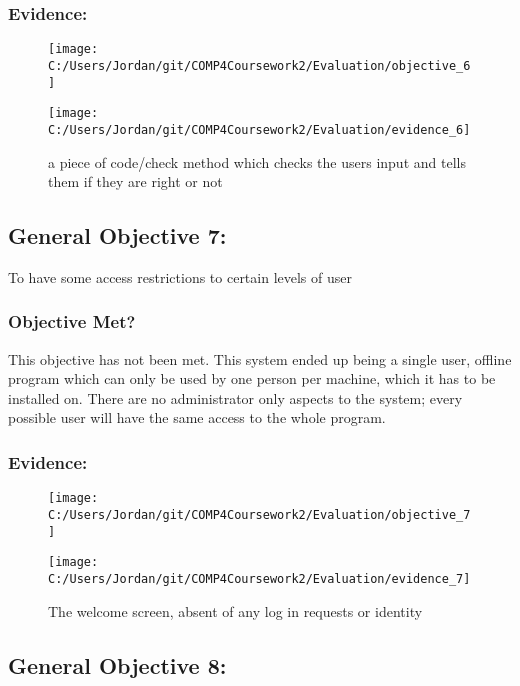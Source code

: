 \subsubsection{Evidence: }

\begin{figure}[H]
	\texttt{[image: C:/Users/Jordan/git/COMP4Coursework2/Evaluation/objective\_6]}
\end{figure}

\begin{figure}[H]
	\texttt{[image: C:/Users/Jordan/git/COMP4Coursework2/Evaluation/evidence\_6]}
	\caption{a piece of code/check method which checks the users input and tells them if they are right or not}
\end{figure}

\subsection{General Objective 7: }

To have some access restrictions to certain levels of user

\subsubsection{Objective Met?}

This objective has not been met. This system ended up being a single user, offline program which can only be used by one person per machine, which it has to be installed on. There are no administrator only aspects to the system; every possible user will have the same access to the whole program.

\subsubsection{Evidence: }

\begin{figure}[H]
	\texttt{[image: C:/Users/Jordan/git/COMP4Coursework2/Evaluation/objective\_7]}
\end{figure}

\begin{figure}[H]
	\texttt{[image: C:/Users/Jordan/git/COMP4Coursework2/Evaluation/evidence\_7]}
	\caption{The welcome screen, absent of any log in requests or identity}
\end{figure}

\subsection{General Objective 8: }

